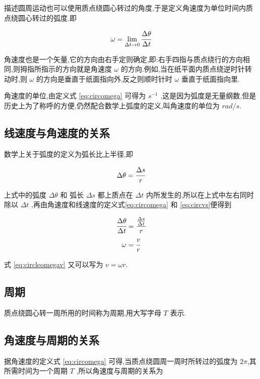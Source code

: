 描述圆周运动也可以使用质点绕圆心转过的角度,于是定义角速度为单位时间内质点绕圆心转过的弧度.即

\begin{equation}
  \omega = \lim_{\Delta t \to 0} \cfrac{\Delta \theta}{\Delta t}
  \label{eq:circomega}
\end{equation}

角速度也是一个矢量,它的方向由右手定则确定,即:右手四指与质点绕行的方向相同,则拇指所指示的方向就是角速度 $\omega$ 的方向.例如,当在纸平面内质点绕逆时针转动时,则 $\omega$ 的方向是垂直于纸面指向外,反之则顺时针时 $\omega $ 垂直于纸面指向里.

角速度的单位,由定义式 \eqref{eq:circomega} 可得为 $ s^{-1}$ ,这是因为弧度是无量纲数,但是历史上为了称呼的方便,仍然配合数学上弧度的定义,叫角速度的单位为 $rad/s$.

\subsection{线速度与角速度的关系}

数学上关于弧度的定义为弧长比上半径,即

\begin{equation*}
  \Delta \theta =\cfrac{\Delta s}{r}
\end{equation*}

上式中的弧度 $\Delta \theta$ 和 弧长 $\Delta s$ 都上质点在 $\Delta t$ 内所发生的,所以在上式中左右同时除以 $\Delta t$ ,再由角速度和线速度的定义式\eqref{eq:circomega} 和 \eqref{eq:circvs}便得到

\begin{gather}
  \cfrac{\Delta \theta}{\Delta t}=\cfrac{\frac{\Delta s}{\Delta t}}{r} \notag \\
  \omega =\cfrac{v}{r}
  \label{eq:circleomegav}
\end{gather}

式 \eqref{eq:circleomegav} 又可以写为 $v=\omega r$.

\subsection{周期}

质点绕圆心转一周所用的时间称为周期,用大写字母 $T$ 表示.

\subsection{角速度与周期的关系}

据角速度的定义式 \eqref{eq:circomega} 可得,当质点绕圆周一周时所转过的弧度为 $2\pi$,其所需时间为一个周期 $T$ ,所以角速度与周期的关系为

